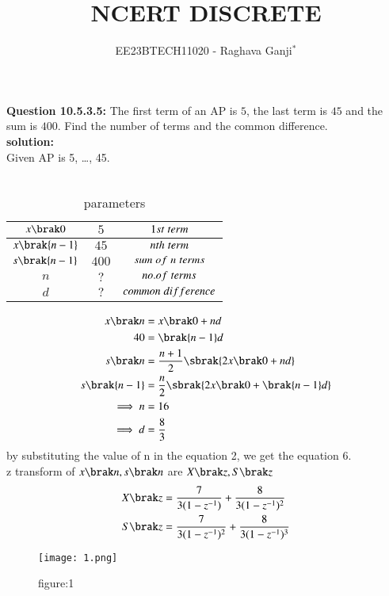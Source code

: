 \documentclass[journal,12pt,twocolumn]{IEEEtran}
\theoremstyle{remark}
\begin{document}

\vspace{3cm}

\title{NCERT DISCRETE}
\author{EE23BTECH11020 - Raghava Ganji$^{*}$%
}
\maketitle
\newpage
\bigskip

\renewcommand{\thefigure}{\theenumi}
\renewcommand{\thetable}{\theenumi}

\textbf{Question 10.5.3.5:}
The first term of an AP is $5$, the last term is $45$ and the sum is $400$. Find the number of terms and the common difference.\\
\textbf{solution:}\\
Given AP is 5, \ldots, 45.\\\\
\begin{table}[h]
\centering
\begin{tabular}{|c|c|c|}\hline
$x\brak 0$ & $5$ & $ 1st\hspace{1mm}term$\\ \hline
$x\brak {n-1}$ & $45$ & $nth\hspace{1mm}term$\\ \hline
$s\brak {n-1}$ & $400$ & $sum\hspace{1mm}of\hspace{1mm}n\hspace{1mm}terms$\\ \hline
$n$ & $?$ & $no.of\hspace{1mm}terms$\\ \hline
$d$ & $?$ & $common\hspace{1mm}difference$\\ \hline
\end{tabular}
\caption{parameters}
\end{table}
\begin{align}
x\brak n&=x\brak 0+nd\\
40&=\brak {n-1}d\\
s\brak n&=\frac{n+1}{2} \sbrak {2x\brak 0+nd}\\
s\brak {n-1}&=\frac{n}{2} \sbrak {2x\brak 0+\brak {n-1}d}\\
\implies n&=16\\
\implies d&=\frac{8}{3}
\end{align}
by substituting the value of n in the equation 2, we get the equation 6.\\
z transform of $x\brak n,s\brak n$ are $X\brak z,S\brak z$
\begin{align}
X\brak z&=\frac{7}{3(1-z^{-1})}+\frac{8}{3(1-z^{-1})^2}\\
S\brak z&=\frac{7}{3(1-z^{-1})^2}+\frac{8}{3(1-z^{-1})^3}
\end{align}
\begin{figure}
    \centering
    \texttt{[image: 1.png]}
    \caption{figure:1}
\end{figure}
\end{document}
